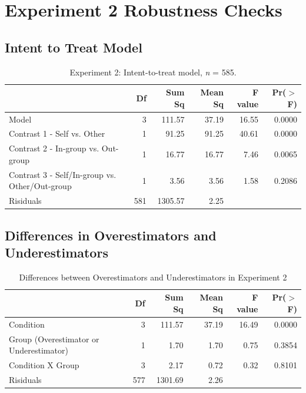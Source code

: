\documentclass[12pt,]{article}
\begin{document}

\newpage
\section{Experiment 2 Robustness Checks}
\label{appendix:robust2}


\subsection{Intent to Treat Model}
\label{appendix:itt2}


\begin{table}[ht]
\centering
\begin{tabular}{lrrrrr}
  \hline
 & Df & Sum Sq & Mean Sq & F value & Pr($>$F) \\ 
  \hline
Model & 3 & 111.57 & 37.19 & 16.55 & 0.0000 \\ 
  Contrast 1 - Self vs. Other & 1 & 91.25 & 91.25 & 40.61 & 0.0000 \\ 
  Contrast 2 - In-group vs. Out-group & 1 & 16.77 & 16.77 & 7.46 & 0.0065 \\ 
  Contrast 3 - Self/In-group vs. Other/Out-group & 1 & 3.56 & 3.56 & 1.58 & 0.2086 \\ 
  Risiduals & 581 & 1305.57 & 2.25 &  &  \\ 
   \hline
\end{tabular}
\caption{Experiment 2: Intent-to-treat model, \emph{n} = 585. } 
\label{ITT2}
\end{table}



\clearpage
\subsection{Differences in Overestimators and Underestimators}
\label{appendix:over_under2}

\begin{table}[ht]
\centering
\begin{tabular}{lrrrrr}
  \hline
 & Df & Sum Sq & Mean Sq & F value & Pr($>$F) \\ 
  \hline
Condition & 3 & 111.57 & 37.19 & 16.49 & 0.0000 \\ 
  Group (Overestimator or Underestimator) & 1 & 1.70 & 1.70 & 0.75 & 0.3854 \\ 
  Condition X Group & 3 & 2.17 & 0.72 & 0.32 & 0.8101 \\ 
  Risiduals & 577 & 1301.69 & 2.26 &  &  \\ 
   \hline
\end{tabular}
\caption{Differences between Overestimators and Underestimators in Experiment 2} 
\label{over_underS2}
\end{table}
\end{document}
